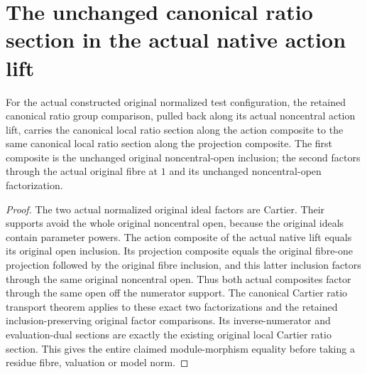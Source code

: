 \section{The unchanged canonical ratio section in the actual native action lift}

\begin{theorem}
\label{thm:pl-original-native-action-lift-canonical-ratio-section}
\leanok
{}
For the actual constructed original normalized test configuration, the
retained canonical ratio group comparison, pulled back along its actual
noncentral action lift, carries the canonical local ratio section along
the action composite to the same canonical local ratio section along
the projection composite. The first composite is the unchanged original
noncentral-open inclusion; the second factors through the actual original
fibre at $1$ and its unchanged noncentral-open factorization.
\end{theorem}
\begin{proof}
The two actual normalized original ideal factors are Cartier. Their
supports avoid the whole original noncentral open, because the original
ideals contain parameter powers. The action composite of the actual
native lift equals its original open inclusion. Its projection composite
equals the original fibre-one projection followed by the original fibre
inclusion, and this latter inclusion factors through the same original
noncentral open. Thus both actual composites factor through the same
open off the numerator support. The canonical Cartier ratio transport
theorem applies to these exact two factorizations and the retained
inclusion-preserving original factor comparisons. Its inverse-numerator
and evaluation-dual sections are exactly the existing original local
Cartier ratio section. This gives the entire claimed module-morphism
equality before taking a residue fibre, valuation or model norm.
\end{proof}
